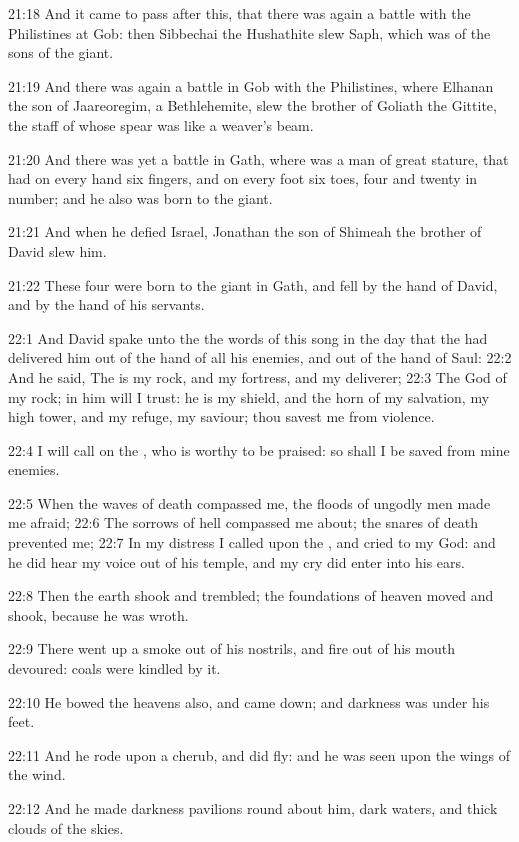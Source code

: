 21:18 And it came to pass after this, that there was again a battle with the Philistines at Gob: then Sibbechai the Hushathite slew Saph, which was of the sons of the giant.

21:19 And there was again a battle in Gob with the Philistines, where Elhanan the son of Jaareoregim, a Bethlehemite, slew the brother of Goliath the Gittite, the staff of whose spear was like a weaver's beam.

21:20 And there was yet a battle in Gath, where was a man of great stature, that had on every hand six fingers, and on every foot six toes, four and twenty in number; and he also was born to the giant.

21:21 And when he defied Israel, Jonathan the son of Shimeah the brother of David slew him.

21:22 These four were born to the giant in Gath, and fell by the hand of David, and by the hand of his servants.

22:1 And David spake unto the \LORD the words of this song in the day that the \LORD had delivered him out of the hand of all his enemies, and out of the hand of Saul: 22:2 And he said, The \LORD is my rock, and my fortress, and my deliverer; 22:3 The God of my rock; in him will I trust: he is my shield, and the horn of my salvation, my high tower, and my refuge, my saviour; thou savest me from violence.

22:4 I will call on the \LORD, who is worthy to be praised: so shall I be saved from mine enemies.

22:5 When the waves of death compassed me, the floods of ungodly men made me afraid; 22:6 The sorrows of hell compassed me about; the snares of death prevented me; 22:7 In my distress I called upon the \LORD, and cried to my God: and he did hear my voice out of his temple, and my cry did enter into his ears.

22:8 Then the earth shook and trembled; the foundations of heaven moved and shook, because he was wroth.

22:9 There went up a smoke out of his nostrils, and fire out of his mouth devoured: coals were kindled by it.

22:10 He bowed the heavens also, and came down; and darkness was under his feet.

22:11 And he rode upon a cherub, and did fly: and he was seen upon the wings of the wind.

22:12 And he made darkness pavilions round about him, dark waters, and thick clouds of the skies.

